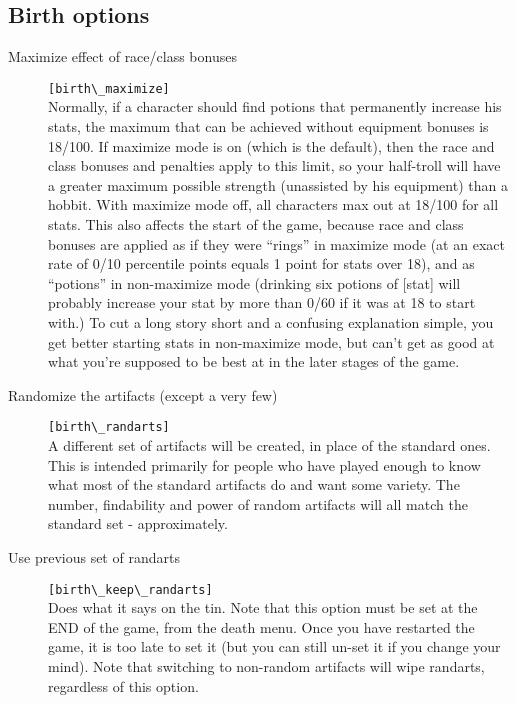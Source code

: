 \subsection{Birth options}
\begin{description}
\item[Maximize effect of race/class bonuses] \verb+[birth\_maximize]+\\
     Normally, if a character should find potions that permanently increase
     his stats, the maximum that can be achieved without equipment bonuses
     is 18/100. If maximize mode is on (which is the default), then the race
     and class bonuses and penalties apply to this limit, so your half-troll
     will have a greater maximum possible strength (unassisted by his
     equipment) than a hobbit. With maximize mode off, all characters max
     out at 18/100 for all stats. This also affects the start of the game,
     because race and class bonuses are applied as if they were
     ``rings'' in
     maximize mode (at an exact rate of 0/10 percentile points equals 1 point
     for stats over 18), and as ``potions'' in non-maximize mode (drinking six
     potions of [stat] will probably increase your stat by more than 0/60 if
     it was at 18 to start with.) To cut a long story short and a confusing
     explanation simple, you get better starting stats in non-maximize mode,
     but can't get as good at what you're supposed to be best at in the later
     stages of the game.

\item[Randomize the artifacts (except a very few)]
    \verb+[birth\_randarts]+\\
     A different set of artifacts will be created, in place of the standard
     ones. This is intended primarily for people who have played enough to
     know what most of the standard artifacts do and want some variety. The
     number, findability and power of random artifacts will all match the
     standard set - approximately.

\item[Use previous set of randarts] \verb+[birth\_keep\_randarts]+\\
     Does what it says on the tin. Note that this option must be set at the
     END of the game, from the death menu. Once you have restarted the game,
     it is too late to set it (but you can still un-set it if you change your
     mind). Note that switching to non-random artifacts will wipe randarts,
     regardless of this option.


\end{description}
